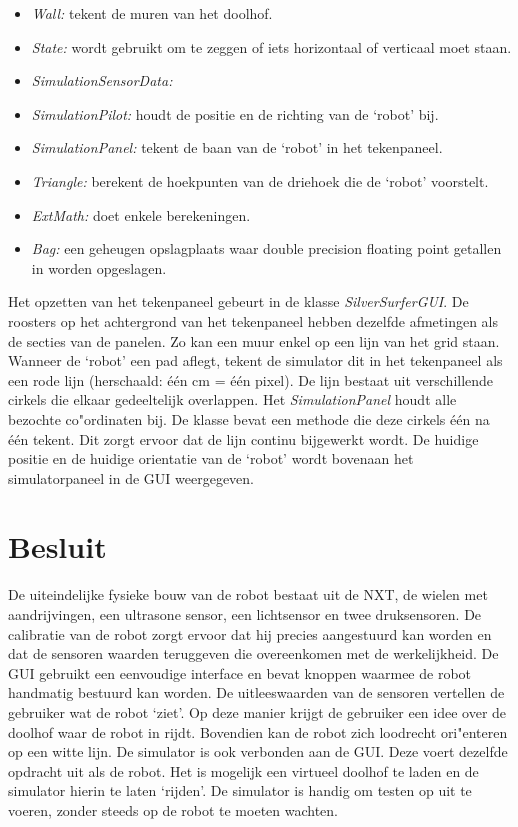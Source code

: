 \documentclass[tt3]{penoverslag}
\begin{document}
\begin{itemize}
\item \textit{Wall:} tekent de muren van het doolhof.
\item \textit{State:} wordt gebruikt om te zeggen of iets horizontaal of verticaal moet staan.
\item \textit{SimulationSensorData: }
\item \textit{SimulationPilot:} houdt de positie en de richting van de `robot' bij.
\item \textit{SimulationPanel:} tekent de baan van de `robot' in het tekenpaneel.
\item \textit{Triangle:} berekent de hoekpunten van de driehoek die de `robot' voorstelt.
\item \textit{ExtMath:} doet enkele berekeningen.
\item \textit{Bag:\cite{Bag.java} } een geheugen opslagplaats waar double precision floating point getallen in worden opgeslagen.
\end{itemize}

Het opzetten van het tekenpaneel gebeurt in de klasse \textit{SilverSurferGUI}. De roosters op het achtergrond van het tekenpaneel hebben dezelfde afmetingen als de secties van de panelen. Zo kan een muur enkel op een lijn van het grid staan.
Wanneer de `robot' een pad aflegt, tekent de simulator dit in het tekenpaneel als een rode lijn (herschaald: \'e\'en cm = \'e\'en pixel). De lijn  bestaat uit verschillende cirkels die elkaar gedeeltelijk overlappen. Het \textit{SimulationPanel} houdt alle bezochte co"ordinaten bij. De klasse bevat een methode die deze cirkels \'e\'en na \'e\'en tekent. Dit zorgt ervoor dat de lijn continu bijgewerkt wordt. De huidige positie en de huidige orientatie van de `robot' wordt bovenaan het simulatorpaneel in de GUI weergegeven.

\section{Besluit} %
\label{sec:besl}
De uiteindelijke fysieke bouw van de robot bestaat uit de NXT, de wielen met aandrijvingen, een ultrasone sensor, een lichtsensor en twee druksensoren.
De calibratie van de robot zorgt ervoor dat hij precies aangestuurd kan worden en dat de sensoren waarden teruggeven die overeenkomen met de werkelijkheid.
De GUI gebruikt een eenvoudige interface en bevat knoppen waarmee de robot handmatig bestuurd kan worden. De uitleeswaarden van de sensoren vertellen de gebruiker wat de robot `ziet'. Op deze manier krijgt de gebruiker een idee over de doolhof waar de robot in rijdt. Bovendien kan de robot zich loodrecht ori"enteren op een witte lijn. De simulator is ook verbonden aan de GUI. Deze voert dezelfde opdracht uit als de robot. Het is mogelijk een virtueel doolhof te laden en de simulator hierin te laten `rijden'. De simulator is handig om testen op uit te voeren, zonder steeds op de robot te moeten wachten.
\end{document}
